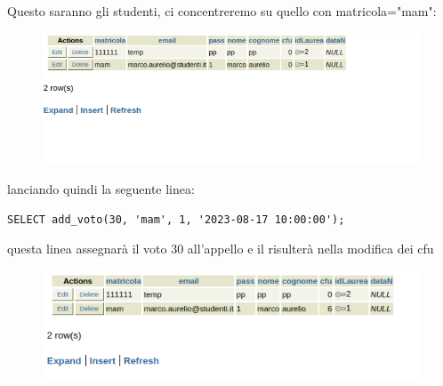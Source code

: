 Questo saranno gli studenti, ci concentreremo su quello con matricola="mam":
\begin{figure}[ht]
    \centering
    \includegraphics[width=0.9\linewidth]{images/studenti1.png}
\end{figure}
lanciando quindi la seguente  linea:
\begin{lstlisting}[style=sqlStyle]
SELECT add_voto(30, 'mam', 1, '2023-08-17 10:00:00');
\end{lstlisting}
questa linea assegnarà il voto 30 all'appello e il risulterà nella modifica dei cfu
\begin{figure}[ht]
    \centering
    \includegraphics[width=0.9\linewidth]{images/studenti2.png}
\end{figure}